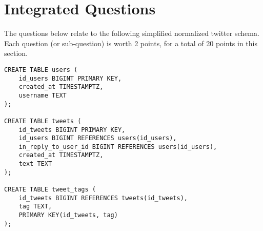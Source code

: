 \documentclass[12pt]{exam}
\theoremstyle{definition}
\begin{document}
\newpage
\section{Integrated Questions}

The questions below relate to the following simplified normalized twitter schema.
Each question (or sub-question) is worth 2 points, for a total of 20 points in this section.

\begin{lstlisting}
CREATE TABLE users (
    id_users BIGINT PRIMARY KEY,
    created_at TIMESTAMPTZ,
    username TEXT
);

CREATE TABLE tweets (
    id_tweets BIGINT PRIMARY KEY,
    id_users BIGINT REFERENCES users(id_users),
    in_reply_to_user_id BIGINT REFERENCES users(id_users),
    created_at TIMESTAMPTZ,
    text TEXT
);

CREATE TABLE tweet_tags (
    id_tweets BIGINT REFERENCES tweets(id_tweets),
    tag TEXT,
    PRIMARY KEY(id_tweets, tag)
);
\end{lstlisting}
\end{document}
